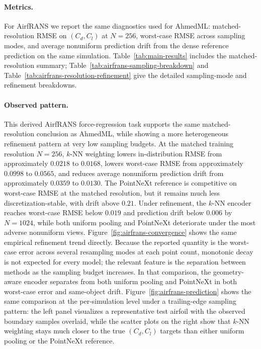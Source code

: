 \documentclass[11pt]{article}
\begin{document}
\paragraph{Metrics.}
For AirfRANS we report the same diagnostics used for AhmedML:
matched-resolution RMSE on $(C_d, C_l)$ at $N{=}256$, worst-case RMSE across
sampling modes, and average nonuniform prediction drift from the dense
reference prediction on the same simulation.  Table~\ref{tab:main-results}
includes the matched-resolution summary; Table~\ref{tab:airfrans-sampling-breakdown}
and Table~\ref{tab:airfrans-resolution-refinement} give the detailed
sampling-mode and refinement breakdowns.




\paragraph{Observed pattern.}
This derived AirfRANS force-regression task supports the same matched-resolution
conclusion as AhmedML, while showing a more heterogeneous refinement pattern at
very low sampling budgets.  At the matched training resolution
$N{=}256$, $k$-NN weighting lowers in-distribution RMSE from approximately
$0.0218$ to $0.0168$, lowers worst-case RMSE from approximately $0.0998$ to
$0.0565$, and reduces average nonuniform prediction drift from approximately
$0.0359$ to $0.0130$.  The PointNeXt reference is competitive on worst-case
RMSE at the matched resolution, but it remains much less discretization-stable,
with drift above $0.21$.  Under refinement, the $k$-NN encoder reaches
worst-case RMSE below $0.019$ and prediction drift below $0.006$ by
$N{=}1024$, while both uniform pooling and PointNeXt deteriorate under the most
adverse nonuniform views.  Figure~\ref{fig:airfrans-convergence} shows the
same empirical refinement trend directly.  Because the reported
quantity is the worst-case error across several resampling modes at each point
count, monotonic decay is not expected for every model; the relevant feature is
the separation between methods as the sampling budget increases.  In that
comparison, the geometry-aware encoder separates from both uniform pooling and
PointNeXt in both worst-case error and same-object drift.  Figure~\ref{fig:airfrans-prediction}
shows the same comparison at the per-simulation level under a
trailing-edge sampling pattern: the left panel visualizes a representative test
airfoil with the observed boundary samples overlaid, while the scatter plots on
the right show that $k$-NN weighting stays much closer to the true $(C_d,C_l)$
targets than either uniform pooling or the PointNeXt reference.
\end{document}
